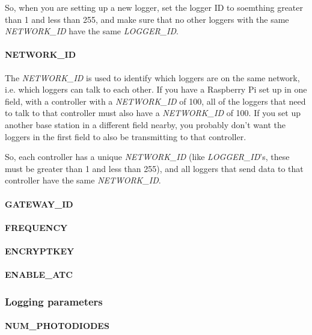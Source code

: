 \documentclass[10pt]{article}
\begin{document}
So, when you are setting up a new logger, set the logger ID to soemthing greater than 1 and less than 255, and make sure that no other loggers with the same 
\textit{NETWORK\_ID} have the same \textit{LOGGER\_ID}. 

\paragraph{NETWORK\_ID}
The \textit{NETWORK\_ID} is used to identify which loggers are on the same network, i.e. which loggers can talk to each other. If you have a Raspberry Pi set up in one
field, with a controller with a \textit{NETWORK\_ID} of 100, all of the loggers that need to talk to that controller must also have a \textit{NETWORK\_ID} of 100. If you 
set up another base station in a different field nearby, you probably don't want the loggers in the first field to also be transmitting to that controller.

So, each controller has a unique \textit{NETWORK\_ID} (like \textit{LOGGER\_ID}'s, these must be greater than 1 and less than 255), and all loggers that send data to
that controller have the same \textit{NETWORK\_ID}.

\paragraph{GATEWAY\_ID}

\paragraph{FREQUENCY}

\paragraph{ENCRYPTKEY}

\paragraph{ENABLE\_ATC}

\subsubsection{Logging parameters}

\paragraph{NUM\_PHOTODIODES}
\end{document}

